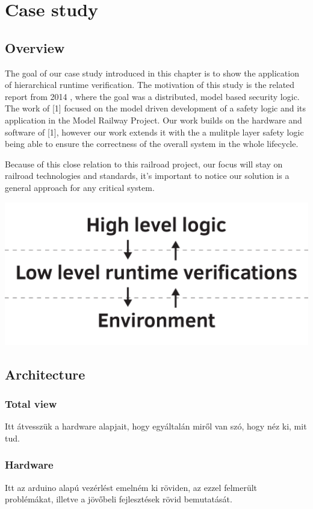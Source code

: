 \chapter{Case study}
\label{chap:case_study}

\section{Overview}

The goal of our case study introduced in this chapter is to show the application of hierarchical runtime verification. The motivation of this study is the related report from 2014 \citep{tdk2014}, where the goal was a distributed, model based security logic. The work of [1] focused on the model driven development of a safety logic and its application in the Model Railway Project. Our work builds on the hardware and software of [1], however our work extends it with the a mulitple layer safety logic being able to ensure the correctness of the overall system in the whole lifecycle.

Because of this close relation to this railroad project, our focus will stay on railroad technologies and standards, it's important to notice our solution is a general approach for any critical system.
\begin{minipage}{\textwidth}
	\centering
	\includegraphics[width=0.75\linewidth]{include/figures/chapter_6/overview_1}
\end{minipage}

\section{Architecture}
	\subsection{Total view}
	\label{sec:case_study:total_view}
	Itt átvesszük a hardware alapjait, hogy egyáltalán miről van szó, hogy néz ki, mit tud.
	\subsection{Hardware}
	Itt az arduino alapú vezérlést emelném ki röviden, az ezzel felmerült problémákat, illetve a jövőbeli fejlesztések rövid bemutatását.

